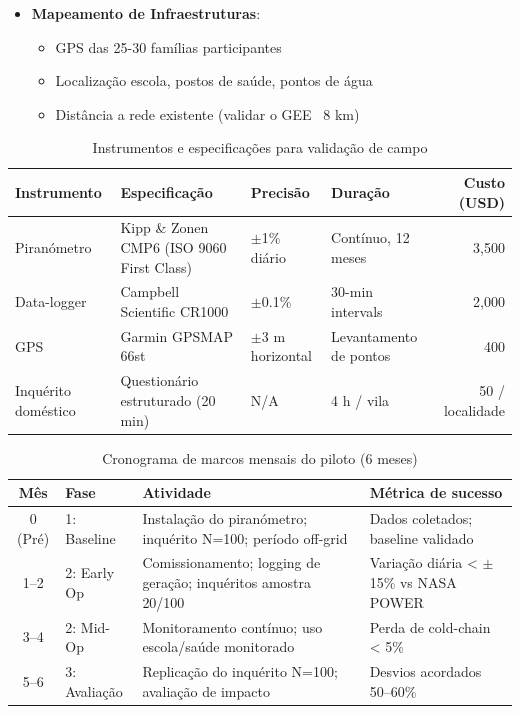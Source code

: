 \documentclass[12pt, a4paper]{article}
\begin{document}
{{{{{{{{{{{{\begin{itemize}
\item \textbf{Mapeamento de Infraestruturas}:
  \begin{itemize}
  \item GPS das 25-30 famílias participantes
  \item Localização escola, postos de saúde, pontos de água
  \item Distância a rede existente (validar o GEE ~8 km)
  \end{itemize}
\end{itemize}
\begin{table}[H]
\centering
\caption{Instrumentos e especificações para validação de campo}
\label{tab:validation_instruments}
\footnotesize
\begin{tabular}{@{}p{3.5cm}p{5cm}p{2.5cm}p{2.5cm}r@{}}
\toprule
\textbf{Instrumento} & \textbf{Especificação} & \textbf{Precisão} & \textbf{Duração} & \textbf{Custo (USD)} \\
\midrule
Piranómetro & Kipp \& Zonen CMP6 (ISO 9060 First Class) & $\pm$1\% diário & Contínuo, 12 meses & 3,500 \\
Data-logger & Campbell Scientific CR1000 & $\pm$0.1\% & 30-min intervals & 2,000 \\
GPS & Garmin GPSMAP 66st & $\pm$3 m horizontal & Levantamento de pontos & 400 \\
Inquérito doméstico & Questionário estruturado (20 min) & N/A & 4 h / vila & 50 / localidade \\
\bottomrule
\end{tabular}
\end{table}

\begin{table}[H]
\centering
\caption{Cronograma de marcos mensais do piloto (6 meses)}
\label{tab:validation_timeline}
\begin{tabular}{|c|l|p{7cm}|p{3.5cm}|}
\hline
\textbf{Mês} & \textbf{Fase} & \textbf{Atividade} & \textbf{Métrica de sucesso} \\
\hline
0 (Pré) & 1: Baseline & Instalação do piranómetro; inquérito N=100; período off-grid & Dados coletados; baseline validado \\
\hline
1--2 & 2: Early Op & Comissionamento; logging de geração; inquéritos amostra 20/100 & Variação diária < $\pm$15\% vs NASA POWER \\
\hline
3--4 & 2: Mid-Op & Monitoramento contínuo; uso escola/saúde monitorado & Perda de cold-chain < 5\% \\
\hline
5--6 & 3: Avaliação & Replicação do inquérito N=100; avaliação de impacto & Desvios acordados 50--60\% \\
\hline
\end{tabular}
\end{table}

}}}}}}}}}}}}
\end{document}
